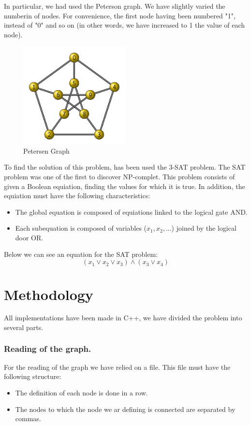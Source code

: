 \documentclass{article}
\begin{document}
    In particular, we had used the Peterson graph. We have slightly varied the numberin of nodes. For 
    convenience, the first node having been numbered "1", instead of "0" and so on (in other words, we 
    have increased to 1 the value of each node).

    \begin{figure}[H]
        \centering
        \includegraphics[width=0.5\textwidth]{pictures/PetersenGraph.png}
        \caption{Petersen Graph}
    \end{figure}

    To find the solution of this problem, has been used the 3-SAT problem. 
    The SAT problem was one of the first to discover NP-complet.
    This problem consists of given a Boolean equiation, finding the values for 
    which it is true. In addition, the equiation must have the following characteristics:
 
    \begin{itemize}
        \item The global equation is composed of equiations linked to the logical gate AND.
        \item Each subequation is composed of variables  ($x_1, x_2, ...$) joined by the logical door OR.
    \end{itemize}

    Below we can see an equation for the SAT problem:
        \[ ( x_1 \vee x_2 \vee x_3) \wedge (x_3 \vee x_4)\]

    
\section{Methodology}
All implementations have been made in C++, we have divided the problem into several parts.
    \subsubsection{Reading of the graph.}
    For the reading of the graph we have relied on a file. This file must have the following structure:
        \begin{itemize}
            \item The definition of each node is done in a row.
            \item The nodes to which the node we ar defining is connected are separated by commas.
        \end{itemize}
        
\end{document}
